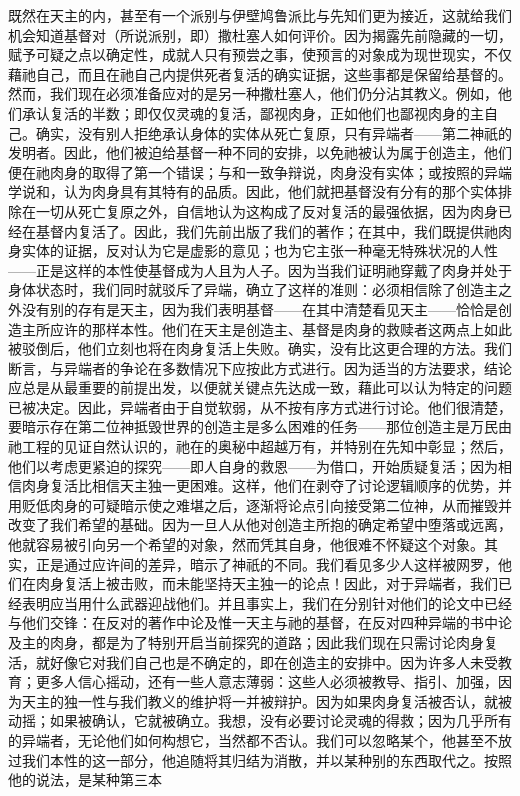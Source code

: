既然在天主的内，甚至有一个派别与伊壁鸠鲁派比与先知们更为接近，这就给我们机会知道基督对（所说派别，即）撒杜塞人如何评价。因为揭露先前隐藏的一切，赋予可疑之点以确定性，成就人只有预尝之事，使预言的对象成为现世现实，不仅藉祂自己，而且在祂自己内提供死者复活的确实证据，这些事都是保留给基督的。然而，我们现在必须准备应对的是另一种撒杜塞人，他们仍分沾其教义。例如，他们承认复活的半数；即仅仅灵魂的复活，鄙视肉身，正如他们也鄙视肉身的主自己。确实，没有别人拒绝承认身体的实体从死亡复原，只有异端者——第二神祇的发明者。因此，他们被迫给基督一种不同的安排，以免祂被认为属于创造主，他们便在祂肉身的取得了第一个错误；与和一致争辩说，肉身没有实体；或按照的异端学说和，认为肉身具有其特有的品质。因此，他们就把基督没有分有的那个实体排除在一切从死亡复原之外，自信地认为这构成了反对复活的最强依据，因为肉身已经在基督内复活了。因此，我们先前出版了我们的著作；在其中，我们既提供祂肉身实体的证据，反对认为它是虚影的意见；也为它主张一种毫无特殊状况的人性——正是这样的本性使基督成为人且为人子。因为当我们证明祂穿戴了肉身并处于身体状态时，我们同时就驳斥了异端，确立了这样的准则：必须相信除了创造主之外没有别的存有是天主，因为我们表明基督——在其中清楚看见天主——恰恰是创造主所应许的那样本性。他们在天主是创造主、基督是肉身的救赎者这两点上如此被驳倒后，他们立刻也将在肉身复活上失败。确实，没有比这更合理的方法。我们断言，与异端者的争论在多数情况下应按此方式进行。因为适当的方法要求，结论应总是从最重要的前提出发，以便就关键点先达成一致，藉此可以认为特定的问题已被决定。因此，异端者由于自觉软弱，从不按有序方式进行讨论。他们很清楚，要暗示存在第二位神抵毁世界的创造主是多么困难的任务——那位创造主是万民由祂工程的见证自然认识的，祂在的奥秘中超越万有，并特别在先知中彰显；然后，他们以考虑更紧迫的探究——即人自身的救恩——为借口，开始质疑复活；因为相信肉身复活比相信天主独一更困难。这样，他们在剥夺了讨论逻辑顺序的优势，并用贬低肉身的可疑暗示使之难堪之后，逐渐将论点引向接受第二位神，从而摧毁并改变了我们希望的基础。因为一旦人从他对创造主所抱的确定希望中堕落或远离，他就容易被引向另一个希望的对象，然而凭其自身，他很难不怀疑这个对象。其实，正是通过应许间的差异，暗示了神祇的不同。我们看见多少人这样被网罗，他们在肉身复活上被击败，而未能坚持天主独一的论点！因此，对于异端者，我们已经表明应当用什么武器迎战他们。并且事实上，我们在分别针对他们的论文中已经与他们交锋：在反对的著作中论及惟一天主与祂的基督，在反对四种异端的书中论及主的肉身，都是为了特别开启当前探究的道路；因此我们现在只需讨论肉身复活，就好像它对我们自己也是不确定的，即在创造主的安排中。因为许多人未受教育；更多人信心摇动，还有一些人意志薄弱：这些人必须被教导、指引、加强，因为天主的独一性与我们教义的维护将一并被辩护。因为如果肉身复活被否认，就被动摇；如果被确认，它就被确立。我想，没有必要讨论灵魂的得救；因为几乎所有的异端者，无论他们如何构想它，当然都不否认。我们可以忽略某个，他甚至不放过我们本性的这一部分，他追随将其归结为消散，并以某种别的东西取代之。按照他的说法，是某种第三本